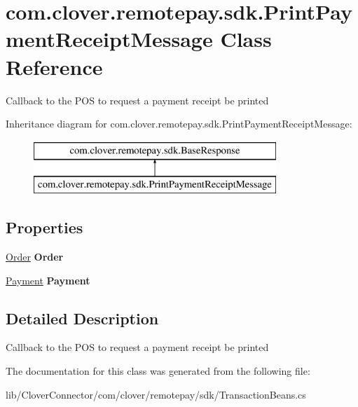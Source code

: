 \hypertarget{classcom_1_1clover_1_1remotepay_1_1sdk_1_1_print_payment_receipt_message}{}\section{com.\+clover.\+remotepay.\+sdk.\+Print\+Payment\+Receipt\+Message Class Reference}
\label{classcom_1_1clover_1_1remotepay_1_1sdk_1_1_print_payment_receipt_message}


Callback to the P\+OS to request a payment receipt be printed  


Inheritance diagram for com.\+clover.\+remotepay.\+sdk.\+Print\+Payment\+Receipt\+Message\+:\begin{figure}[H]
\begin{center}
\leavevmode
\includegraphics[height=2.000000cm]{classcom_1_1clover_1_1remotepay_1_1sdk_1_1_print_payment_receipt_message}
\end{center}
\end{figure}
\subsection*{Properties}
\begin{DoxyCompactItemize}
\item 
\mbox{\label{classcom_1_1clover_1_1remotepay_1_1sdk_1_1_print_payment_receipt_message_ac8a030a3cf9e33eced012fe0664b1271}} 
\hyperlink{classcom_1_1clover_1_1sdk_1_1v3_1_1order_1_1_order}{Order} {\bfseries Order}
\item 
\mbox{\label{classcom_1_1clover_1_1remotepay_1_1sdk_1_1_print_payment_receipt_message_a199fbecfd435a443be49fa6c069f209a}} 
\hyperlink{classcom_1_1clover_1_1sdk_1_1v3_1_1payments_1_1_payment}{Payment} {\bfseries Payment}
\end{DoxyCompactItemize}


\subsection{Detailed Description}
Callback to the P\+OS to request a payment receipt be printed 



The documentation for this class was generated from the following file\+:\begin{DoxyCompactItemize}
\item 
lib/\+Clover\+Connector/com/clover/remotepay/sdk/Transaction\+Beans.\+cs\end{DoxyCompactItemize}
